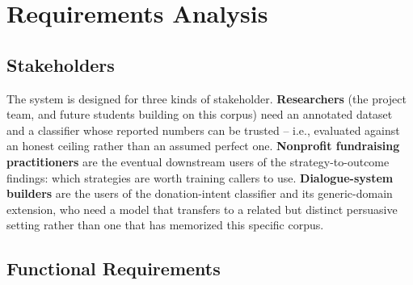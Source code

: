 \chapter{Requirements Analysis}
\label{ch:requirements}

\section{Stakeholders}

The system is designed for three kinds of stakeholder. \textbf{Researchers}
(the project team, and future students building on this corpus) need an
annotated dataset and a classifier whose reported numbers can be trusted --
i.e., evaluated against an honest ceiling rather than an assumed perfect
one. \textbf{Nonprofit fundraising practitioners} are the eventual downstream
users of the strategy-to-outcome findings: which strategies are worth
training callers to use. \textbf{Dialogue-system builders} are the users of
the donation-intent classifier and its generic-domain extension, who need a
model that transfers to a related but distinct persuasive setting rather than
one that has memorized this specific corpus.

\section{Functional Requirements}

